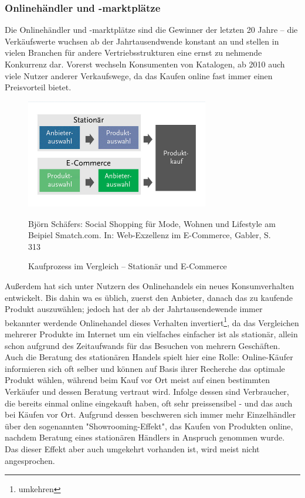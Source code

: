 \begin{folding}
\end{folding}

\begin{folding} \subsubsection{Onlinehändler und -marktplätze}

Die Onlinehändler und -marktplätze sind die Gewinner der letzten 20 Jahre – die Verkäufswerte wuchsen ab der Jahrtausendwende konstant an und stellen in vielen Branchen für andere Vertriebsstrukturen eine ernst zu nehmende Konkurrenz dar\cite{wolf}. Vorerst wechseln Konsumenten von Katalogen, ab 2010 auch viele Nutzer anderer Verkaufswege, da das Kaufen online fast immer einen Preisvorteil bietet\cite[S. 31]{Graf}.
\begin{figure}[h]
    \begin{center}
        \includegraphics[width=8cm]{media/Fabian-konsumwandel.png}
        \caption{Kaufprozess im Vergleich – Stationär und E-Commerce}
        \label{konsumwandel}
        \bildquelle Björn Schäfers: Social Shopping für Mode, Wohnen und Lifestyle am Beipiel Smatch.com. In: Web-Exzellenz im E-Commerce, Gabler, S. 313 %
    \end{center}
\end{figure} 
Außerdem hat sich unter Nutzern des Onlinehandels ein neues Konsumverhalten entwickelt. Bis dahin wa es üblich, zuerst den Anbieter, danach das zu kaufende Produkt auszuwählen; jedoch hat der ab der Jahrtausendewende immer bekannter werdende Onlinehandel dieses Verhalten invertiert\footnote{umkehren}, da das Vergleichen mehrerer Produkte im Internet um ein vielfaches einfacher ist als stationär, allein schon aufgrund des Zeitaufwands für das Besuchen von mehrern Geschäften\cite[S 22f]{Graf}. Auch die Beratung des stationären Handels spielt hier eine Rolle: Online-Käufer informieren sich oft selber und können auf Basis ihrer Recherche das optimale Produkt wählen, während beim Kauf vor Ort meist auf einen bestimmten Verkäufer und dessen Beratung vertraut wird\cite[S. 15f]{evilcom}. Infolge dessen sind Verbraucher, die bereits einmal online eingekauft haben, oft sehr preissensibel - und das auch bei Käufen vor Ort\cite[S. 60]{Nitt}. Aufgrund dessen beschweren sich immer mehr Einzelhändler über den sogenannten "Showrooming-Effekt", das Kaufen von Produkten online, nachdem Beratung eines stationären Händlers in Anspruch genommen wurde. Das dieser Effekt aber auch umgekehrt vorhanden ist, wird meist nicht angesprochen\cite[S. 21f]{evilcom}.

\end{folding}
